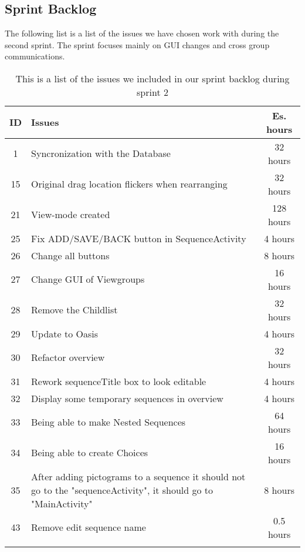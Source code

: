 \subsection{Sprint Backlog}\label{subsec:spr2_sprblog}
The following list is a list of the issues we have chosen work with during the second sprint. The sprint focuses mainly on GUI changes and cross group communications.
\begin{longtable} { | c | p{12cm} | c | } 
\hline
	ID 	&	Issues	&		 Es. hours \\\hline
	1	& 	Syncronization with the Database	&	32 hours	\\\hline
	15	& 	Original drag location flickers when rearranging	&	32 hours	\\\hline
	21	& 	View-mode created	&	128 hours	\\\hline	
	25	& 	Fix ADD/SAVE/BACK button in SequenceActivity	&	4 hours	\\\hline
	26	& 	Change all buttons	&	8 hours	\\\hline
	27	& 	Change GUI of Viewgroups	&	16 hours	\\\hline
	28	& 	Remove the Childlist	&	32 hours	\\\hline
	29	& 	Update to Oasis	&	4 hours	\\\hline
	30	& 	Refactor overview	&	32 hours	\\\hline
	31	& 	Rework sequenceTitle box to look editable	&	4 hours	\\\hline
	32	& 	Display some temporary sequences in overview	&	4 hours	\\\hline
	33 	&	Being able to make Nested Sequences	&	64 hours \\\hline
	34 	&	Being able to create Choices	&	16 hours \\\hline
	35  &   After adding pictograms to a sequence it should not go to the "sequenceActivity", it should go to "MainActivity" & 8 hours \\\hline
	43  &   Remove edit sequence name & 0.5 hours \\\hline
\caption{This is a list of the issues we included in our sprint backlog during sprint 2}
\label{tab:spr2_sprintblog}
\end{longtable}